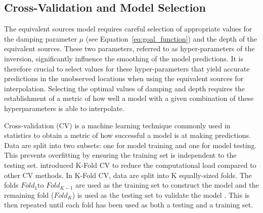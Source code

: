 \subsection{Cross-Validation and Model Selection}

The equivalent sources model requires careful selection of appropriate values for the damping parameter $\mu$ (see Equation~\ref{eq:goal_function}) and the depth of the equivalent sources. 
These two parameters, referred to as hyper-parameters of the inversion, significantly influence the smoothing of the model predictions. It is therefore crucial to select values for these hyper-parameters that yield accurate predictions in the unobserved locations when using the equivalent sources for interpolation. Selecting the optimal values of damping and depth requires the establishment of a metric of how well a model with a given combination of these hyperparameters is able to interpolate.

Cross-validation (CV) is a machine learning technique commonly used in statistics to obtain a metric of how successful a model is at making predictions. Data are split into two subsets: one for model training and one for model testing. This prevents overfitting by ensuring the training set is independent to the testing set. \citet{Geisser1975} introduced K-Fold CV to reduce the computational load compared to other CV methods. In K-Fold CV, data are split into K equally-sized folds. The folds $Fold_1 \text{to } Fold_{K-1}$ are used as the training set to construct the model and the remaining fold ($Fold_K$) is used as the testing set to validate the model \citep{Jung2017}. This is then repeated until each fold has been used as both a testing and a training set.

